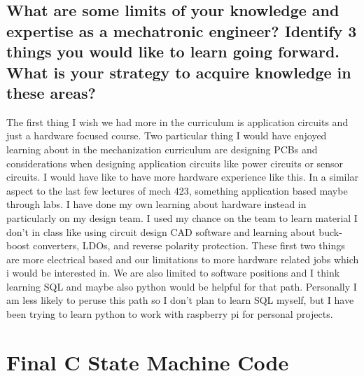 \documentclass[11pt]{article}
\begin{document}
\subsection*{What are some limits of your knowledge and expertise as a mechatronic engineer? Identify 3 things you would like to learn going forward. What is your strategy to acquire knowledge in these areas?}
The first thing I wish we  had more in the curriculum is application circuits and just a hardware focused course.
Two particular thing I would have enjoyed learning about in the mechanization curriculum are designing PCBs and considerations when designing application circuits like power circuits or sensor circuits.
I would have like to have more hardware experience like this.
In a similar aspect to the last few lectures of mech 423, something application based maybe through labs.
I have done my own learning about hardware instead in particularly on my design team.
I used my chance on the team to learn material I don't in class like using circuit design CAD software and learning about buck-boost converters, LDOs, and reverse polarity protection.
These first two things are more electrical based and our limitations to more hardware related jobs which i would be interested in. 
We are also limited to software positions and I think learning SQL and maybe also python would be helpful for that path. 
Personally I am less likely to peruse this path so I don't plan to learn SQL myself, but I have been trying to learn python to work with raspberry pi for personal projects.   

\appendix
\newpage
\section{Final C State Machine Code} \label{sec:code}

\end{document}
